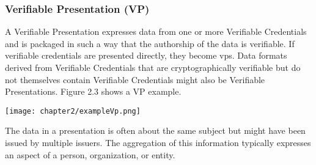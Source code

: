 \subsubsection{Verifiable Presentation (VP)}
A Verifiable Presentation\cite{site:w3cvc} expresses data from one or more Verifiable Credentials and is 
packaged in such a way that the authorship of the data is verifiable. If verifiable 
credentials are presented directly, they become \acrshort{vp}s. Data formats 
derived from Verifiable Credentials that are cryptographically verifiable but do not 
themselves contain Verifiable Credentials might also be Verifiable Presentations.
Figure 2.3 shows a VP example.
\begin{center}
    \vspace{-0.3cm}
    \texttt{[image: chapter2/exampleVp.png]}
    \vspace{-0.3cm}
\end{center}
The data in a presentation is often about the same subject but might have been issued by 
multiple issuers. The aggregation of this information typically expresses an aspect of 
a person, organization, or entity.

